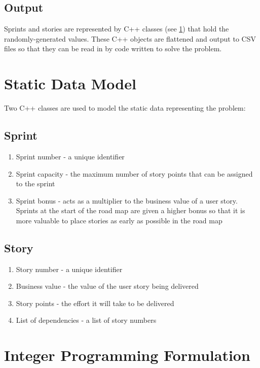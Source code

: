 \subsection{Output}
Sprints and stories are represented by C++ classes (see \cref{sec:Model}) that hold the randomly-generated values. These C++ objects are flattened and output to CSV files so that they can be read in by code written to solve the problem.

\section{Static Data Model}\label{sec:Model}
Two C++ classes are used to model the static data representing the problem:

\subsection{Sprint}
\begin{enumerate}
    \item Sprint number - a unique identifier
    \item Sprint capacity - the maximum number of story points that can be assigned to the sprint
    \item Sprint bonus - acts as a multiplier to the business value of a user story. Sprints at the start of the road map are given a higher bonus so that it is more valuable to place stories as early as possible in the road map
\end{enumerate}

\subsection{Story}
\begin{enumerate}
    \item Story number - a unique identifier
    \item Business value - the value of the user story being delivered
    \item Story points - the effort it will take to be delivered
    \item List of dependencies - a list of story numbers
\end{enumerate}

\section{Integer Programming Formulation}
\label{sec:integer_prog_formulation}


